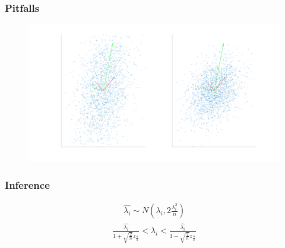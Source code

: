 \documentclass[aspectratio=169,10pt,t]{beamer}
\begin{document}
\begin{frame}[t]
    \frametitle{Pitfalls}

    \begin{figure}[H]
        \centering
        \includegraphics[width=0.8\linewidth]{images/compare.png}
    \end{figure}
    
\end{frame}

\begin{frame}[t]
    \frametitle{Inference}
    
    \begin{align*}
        \hat{\lambda_i} \sim N\left(\lambda_i,2\frac{\lambda_i^2}{n}\right) 
    \end{align*}
    \begin{align*}
        \frac{ \hat{\lambda_i}  }{1+ \sqrt{ \frac{2}{n} } z_{\frac{\alpha }{2}}} < \lambda_i < \frac{ \hat{\lambda_i}  }{1- \sqrt{ \frac{2}{n} } z_{\frac{\alpha }{2}}}
    \end{align*}
    
    

\end{frame}
\end{document}
